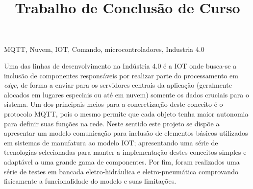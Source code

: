 \documentclass[dissertgrad,oneside]{tcc}
\title{Trabalho de Conclusão de Curso}
\begin{document}
\pretextual

\maketitle






\begin{resumo}{MQTT, Nuvem, IOT, Comando, microcontroladores, Industria 4.0}

    Uma das linhas de desenvolvimento na Indústria 4.0 é a \ac{IOT} onde busca-se a inclusão de componentes responsáveis por 
    realizar parte do processamento em \textit{edge}, de forma a enviar para os servidores centrais da aplicação (geralmente 
    alocados em lugares especiais ou até em nuvem) somente os dados cruciais para o sistema. Um dos principais meios para a 
    concretização deste conceito é o protocolo \ac{MQTT}, pois o mesmo permite que cada objeto tenha maior autonomia para definir suas funções
    na rede.
    Neste sentido este projeto se dispõe a apresentar um modelo comunicação para inclusão de
    elementos básicos utilizados em sistemas de manufatura ao modelo \ac{IOT}; apresentando uma série de tecnologias 
    selecionadas para manter a implementação destes conceitos simples e adaptável a uma grande gama de componentes.
    Por fim, foram realizados uma série de testes em bancada eletro-hidráulica e eletro-pneumática comprovando fisicamente
    a funcionalidade do modelo e suas limitações.   

\end{resumo}
\end{document}
